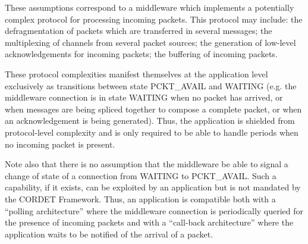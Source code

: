 These assumptions correspond to a middleware which implements a potentially complex protocol for processing incoming packets. This protocol may include: the defragmentation of packets which are transferred in several messages; the multiplexing of channels from several packet sources; the generation of low-level acknowledgements for incoming packets; the buffering of incoming packets. 

These protocol complexities manifest themselves at the application level exclusively as transitions between state PCKT\_AVAIL and WAITING (e.g. the middleware connection  is in state WAITING when no packet has arrived, or when messages are being spliced together to compose a complete packet, or when an acknowledgement is being generated). Thus, the application is shielded from protocol-level complexity and is only required to be able to handle periods when no incoming packet is present.

Note also that there is no assumption that the middleware be able to signal a change of state of a connection from WAITING to PCKT\_AVAIL. Such a capability, if it exists, can be exploited by an application but is not mandated by the CORDET Framework. Thus, an application is compatible both with a “polling architecture” where the middleware connection is periodically queried for the presence of incoming packets and with a “call-back architecture” where the application waits to be notified of the arrival of a packet. 
